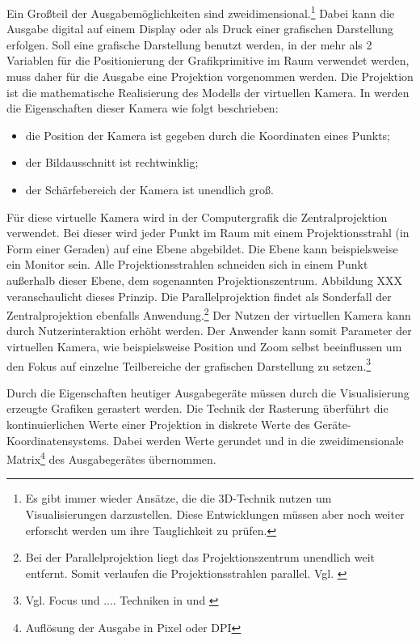 \documentclass[a4paper, 12pt, DIVcalc, onepage, pdftex, headsepline, footsepline]{scrreprt}
\begin{document}
Ein Großteil der Ausgabemöglichkeiten sind zweidimensional.\footnote{Es gibt immer wieder
Ansätze, die die 3D-Technik nutzen um Visualisierungen darzustellen. Diese Entwicklungen
müssen aber noch weiter erforscht werden um ihre Tauglichkeit zu prüfen.} Dabei kann
die Ausgabe digital auf einem Display oder als Druck einer grafischen Darstellung
erfolgen. Soll eine grafische Darstellung benutzt werden, in der mehr als 2 Variablen
für die Positionierung der Grafikprimitive im Raum verwendet werden, muss daher für die
Ausgabe eine Projektion vorgenommen werden. Die Projektion ist die mathematische
Realisierung des Modells der virtuellen Kamera. In \citep[S.\,26]{Computergrafik} werden die 
Eigenschaften dieser Kamera wie folgt beschrieben:
\begin{itemize}
\item die Position der Kamera ist gegeben durch die Koordinaten eines Punkts;
\item der Bildausschnitt ist rechtwinklig;
\item der Schärfebereich der Kamera ist unendlich groß.
\end{itemize}
Für diese virtuelle Kamera wird in der Computergrafik die Zentralprojektion verwendet.
Bei dieser wird jeder Punkt im Raum mit einem Projektionsstrahl (in Form einer Geraden)
auf eine Ebene abgebildet. Die Ebene kann beispielsweise ein Monitor sein. Alle 
Projektionsstrahlen schneiden sich in einem Punkt außerhalb dieser Ebene, dem sogenannten
Projektionszentrum. Abbildung XXX veranschaulicht dieses Prinzip. Die Parallelprojektion
findet als Sonderfall der Zentralprojektion ebenfalls Anwendung.\footnote{Bei der
Parallelprojektion liegt das Projektionszentrum unendlich weit entfernt. Somit verlaufen
die Projektionsstrahlen parallel. Vgl. \citep{wiki_projektion}} Der Nutzen der virtuellen
Kamera kann durch Nutzerinteraktion erhöht werden. Der Anwender kann somit Parameter der
virtuellen Kamera, wie beispielsweise Position und Zoom selbst beeinflussen um den Fokus
auf einzelne Teilbereiche der grafischen Darstellung zu setzen.\footnote{Vgl. Focus und
.... Techniken in \citep[S.\,1]{Schumann} und \citep[S.\,1]{Preim}}

Durch die Eigenschaften heutiger Ausgabegeräte müssen durch die Visualisierung erzeugte
Grafiken gerastert werden. Die Technik der Rasterung überführt die kontinuierlichen Werte
einer Projektion in diskrete Werte des Geräte-Koordinatensystems. Dabei werden Werte
gerundet und in die zweidimensionale Matrix\footnote{Auflösung der Ausgabe in Pixel oder DPI}
des Ausgabegerätes übernommen.
\end{document}
